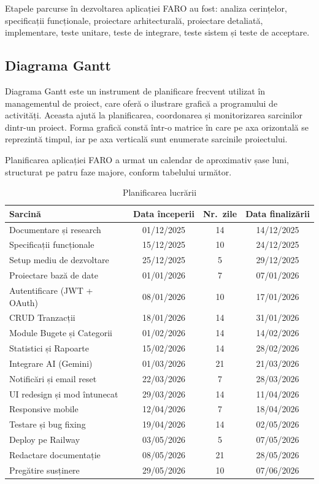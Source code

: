 \documentclass[12pt,a4paper,oneside]{report}
\begin{document}
Etapele parcurse în dezvoltarea aplicației FARO au fost: analiza cerințelor, specificații funcționale, proiectare arhitecturală, proiectare detaliată, implementare, teste unitare, teste de integrare, teste sistem și teste de acceptare.

\subsection{Diagrama Gantt}

Diagrama Gantt este un instrument de planificare frecvent utilizat în managementul de proiect, care oferă o ilustrare grafică a programului de activități. Aceasta ajută la planificarea, coordonarea și monitorizarea sarcinilor dintr-un proiect. Forma grafică constă într-o matrice în care pe axa orizontală se reprezintă timpul, iar pe axa verticală sunt enumerate sarcinile proiectului. \cite{ref:gantt}

Planificarea aplicației FARO a urmat un calendar de aproximativ șase luni, structurat pe patru faze majore, conform tabelului următor.

\begin{table}[H]
  \centering
  \caption{Planificarea lucrării}
  \label{tab:gantt}
  \begin{tabularx}{\textwidth}{|>{\raggedright\arraybackslash}X|c|c|c|}
    \hline
    \textbf{Sarcină} & \textbf{Data începerii} & \textbf{Nr.~zile} & \textbf{Data finalizării} \\ \hline
    Documentare și research & 01/12/2025 & 14 & 14/12/2025 \\ \hline
    Specificații funcționale & 15/12/2025 & 10 & 24/12/2025 \\ \hline
    Setup mediu de dezvoltare & 25/12/2025 & 5 & 29/12/2025 \\ \hline
    Proiectare bază de date & 01/01/2026 & 7 & 07/01/2026 \\ \hline
    Autentificare (JWT + OAuth) & 08/01/2026 & 10 & 17/01/2026 \\ \hline
    CRUD Tranzacții & 18/01/2026 & 14 & 31/01/2026 \\ \hline
    Module Bugete și Categorii & 01/02/2026 & 14 & 14/02/2026 \\ \hline
    Statistici și Rapoarte & 15/02/2026 & 14 & 28/02/2026 \\ \hline
    Integrare AI (Gemini) & 01/03/2026 & 21 & 21/03/2026 \\ \hline
    Notificări și email reset & 22/03/2026 & 7 & 28/03/2026 \\ \hline
    UI redesign și mod întunecat & 29/03/2026 & 14 & 11/04/2026 \\ \hline
    Responsive mobile & 12/04/2026 & 7 & 18/04/2026 \\ \hline
    Testare și bug fixing & 19/04/2026 & 14 & 02/05/2026 \\ \hline
    Deploy pe Railway & 03/05/2026 & 5 & 07/05/2026 \\ \hline
    Redactare documentație & 08/05/2026 & 21 & 28/05/2026 \\ \hline
    Pregătire susținere & 29/05/2026 & 10 & 07/06/2026 \\ \hline
  \end{tabularx}
\end{table}
\end{document}
